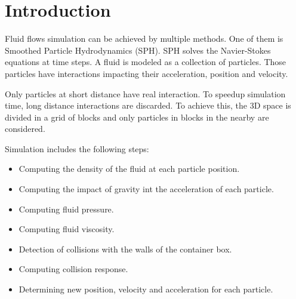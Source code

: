 \section{Introduction}

Fluid flows simulation can be achieved by multiple methods. One of them is
Smoothed Particle Hydrodynamics (SPH). SPH solves the Navier-Stokes equations
at time steps. A fluid is modeled as a collection of particles. Those
particles have interactions impacting their acceleration, position and velocity.

Only particles at short distance have real interaction. To speedup simulation
time, long distance interactions are discarded. To achieve this, the 3D space
is divided in a grid of blocks and only particles in blocks in the nearby are
considered.

Simulation includes the following steps:
\begin{itemize}
\item Computing the density of the fluid at each particle position.
\item Computing the impact of gravity int the acceleration of each particle.
\item Computing fluid pressure.
\item Computing fluid viscosity.
\item Detection of collisions with the walls of the container box.
\item Computing collision response.
\item Determining new position, velocity and acceleration for each particle.
\end{itemize}
